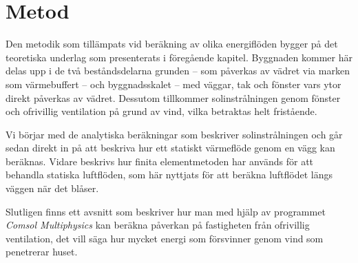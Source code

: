 \chapter{Metod}

Den metodik som tillämpats vid beräkning av olika energiflöden bygger på det teoretiska underlag som presenterats i föregående kapitel. Byggnaden kommer här delas upp i de två beståndsdelarna grunden – som påverkas av vädret via marken som värmebuffert – och byggnadsskalet – med väggar, tak och fönster vars ytor direkt påverkas av vädret. Dessutom tillkommer solinstrålningen genom fönster och ofrivillig ventilation på grund av vind, vilka betraktas helt fristående.

Vi börjar med de analytiska beräkningar som beskriver solinstrålningen och går sedan direkt in på att beskriva hur ett statiskt värmeflöde genom en vägg kan beräknas. Vidare beskrivs hur finita elementmetoden har används för att behandla statiska luftflöden, som här nyttjats för att beräkna luftflödet längs väggen när det blåser.

Slutligen finns ett avsnitt som beskriver hur man med hjälp av programmet \emph{Comsol Multiphysics} kan
beräkna påverkan på fastigheten från ofrivillig ventilation, det vill säga hur mycket energi som försvinner genom vind som penetrerar huset. 








